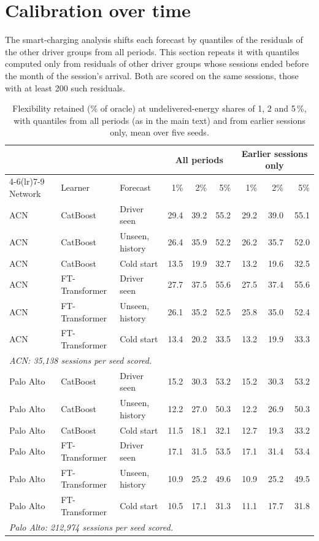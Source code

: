 \section{Calibration over time}\label{sec:s-calibration}
The smart-charging analysis shifts each forecast by quantiles of the residuals of the other driver groups from all periods. This section repeats it with quantiles computed only from residuals of other driver groups whose sessions ended before the month of the session's arrival. Both are scored on the same sessions, those with at least 200 such residuals.
\begin{table}[htbp]\centering\footnotesize
\caption{Flexibility retained (\% of oracle) at undelivered-energy shares of 1, 2 and 5\,\%, with quantiles from all periods (as in the main text) and from earlier sessions only, mean over five seeds.}\label{tab:s-calibration}
\begin{tabular}{lllrrrrrr}
\toprule
 & & & \multicolumn{3}{c}{All periods} & \multicolumn{3}{c}{Earlier sessions only} \\
\cmidrule(lr){4-6}\cmidrule(lr){7-9}
Network & Learner & Forecast & 1\% & 2\% & 5\% & 1\% & 2\% & 5\% \\
\midrule
ACN & CatBoost & Driver seen & 29.4 & 39.2 & 55.2 & 29.2 & 39.0 & 55.1 \\
ACN & CatBoost & Unseen, history & 26.4 & 35.9 & 52.2 & 26.2 & 35.7 & 52.0 \\
ACN & CatBoost & Cold start & 13.5 & 19.9 & 32.7 & 13.2 & 19.6 & 32.5 \\
ACN & FT-Transformer & Driver seen & 27.7 & 37.5 & 55.6 & 27.5 & 37.4 & 55.6 \\
ACN & FT-Transformer & Unseen, history & 26.1 & 35.2 & 52.5 & 25.8 & 35.0 & 52.4 \\
ACN & FT-Transformer & Cold start & 13.4 & 20.2 & 33.5 & 13.2 & 19.9 & 33.3 \\
\multicolumn{9}{l}{\emph{ACN: 35,138 sessions per seed scored.}} \\
\midrule
Palo Alto & CatBoost & Driver seen & 15.2 & 30.3 & 53.2 & 15.2 & 30.3 & 53.2 \\
Palo Alto & CatBoost & Unseen, history & 12.2 & 27.0 & 50.3 & 12.2 & 26.9 & 50.3 \\
Palo Alto & CatBoost & Cold start & 11.5 & 18.1 & 32.1 & 12.7 & 19.3 & 33.2 \\
Palo Alto & FT-Transformer & Driver seen & 17.1 & 31.5 & 53.5 & 17.1 & 31.4 & 53.4 \\
Palo Alto & FT-Transformer & Unseen, history & 10.9 & 25.2 & 49.6 & 10.9 & 25.2 & 49.5 \\
Palo Alto & FT-Transformer & Cold start & 10.5 & 17.1 & 31.3 & 11.1 & 17.7 & 31.8 \\
\multicolumn{9}{l}{\emph{Palo Alto: 212,974 sessions per seed scored.}} \\
\bottomrule
\end{tabular}
\end{table}
